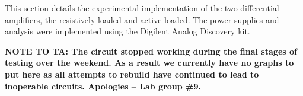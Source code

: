 




This section details the experimental implementation of the two differential amplifiers, the resistively loaded and active loaded. The power supplies and analysis were implemented using the Digilent Analog Discovery kit.

\textbf{NOTE TO TA: The circuit stopped working during the final stages of testing over the weekend. As a result we currently have no graphs to put here as all attempts to rebuild
	have continued to lead to inoperable circuits. Apologies -- Lab group \#9.}
	



